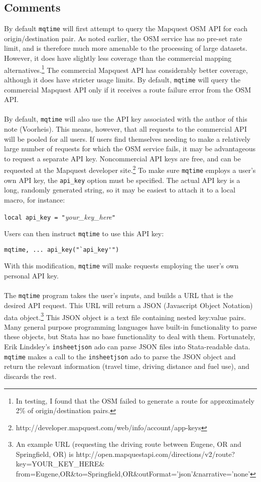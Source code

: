 \documentclass[11pt]{article}
\begin{document}
\subsection{Comments}
By default \verb|mqtime| will first attempt to query the Mapquest OSM API for each origin/destination pair. As noted earlier, the OSM service has no pre-set rate limit, and is therefore much more amenable to the processing of large datasets. However, it does have slightly less coverage than the commercial mapping alternatives.\footnote{In testing, I found that the OSM failed to generate a route for approximately 2\% of origin/destination pairs.} The commercial Mapquest API has considerably better coverage, although it does have stricter usage limits. By default, \verb|mqtime| will query the commercial Mapquest API only if it receives a route failure error from the OSM API. 
\\ \\
By default, \verb|mqtime| will also use the API key associated with the author of this note (Voorheis). This means, however, that all requests to the commercial API will be pooled for all users. If users find themselves needing to make a relatively large number of requests for which the OSM service fails, it may be advantageous to request a separate API key. Noncommercial API keys are free, and can be requested at the Mapquest developer site.\footnote{http://developer.mapquest.com/web/info/account/app-keys} To make sure \verb|mqtime| employs a user's own API key, the \verb|api_key| option must be specified. The actual API key is a long, randomly generated string, so it may be easiest to attach it to a local macro, for instance:
\begin{center}
\verb|local api_key = "|\textit{your\_key\_here}\verb|"|
\end{center}
Users can then instruct \verb|mqtime| to use this API key:
\begin{center}
\verb|mqtime, ... api_key("`api_key'")|
\end{center}
With this modification, \verb|mqtime| will make requests employing the user's own personal API key.
\\ \\
The \verb|mqtime| program takes the user's inputs, and builds a URL that is the desired API request. This URL will return a JSON (Javascript Object Notation) data object.\footnote{An example URL (requesting the driving route between Eugene, OR and Springfield, OR) is http://open.mapquestapi.com/directions/v2/route?key=YOUR\_KEY\_HERE\& from=Eugene,OR\&to=Springfield,OR\&outFormat='json'\&narrative='none'} This JSON object is a text file containing nested key:value pairs. Many general purpose programming languages have built-in functionality to parse these objects, but Stata has no base functionality to deal with them. Fortunately, Erik Lindsley's \verb|insheetjson| ado can parse JSON files into Stata-readable data. \verb|mqtime| makes a call to the \verb|insheetjson| ado to parse the JSON object and return the relevant information (travel time, driving distance and fuel use), and discards the rest.
\end{document}
